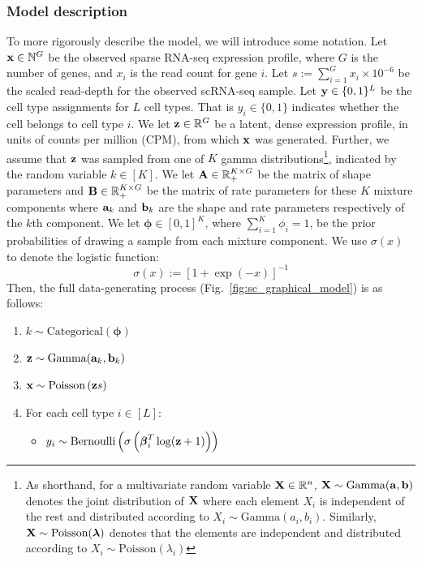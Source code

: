 \subsubsection{Model description}

To more rigorously describe the model, we will introduce some notation. Let $\bold{x} \in \mathbb{N}^G$ be the observed sparse RNA-seq expression profile, where $G$ is the number of genes, and $x_i$ is the read count for gene $i$.  Let $s := \sum_{i=1}^G x_i \times 10^{-6}$ be the scaled read-depth for the observed scRNA-seq sample. Let $\bold{y} \in \{0, 1\}^L$ be the cell type assignments for $L$ cell types. That is $y_i \in \{0, 1\}$ indicates whether the cell belongs to cell type $i$.  We let $\bold{z} \in \mathbb{R}^G$ be a latent, dense expression profile, in units of counts per million (CPM), from which $\bold{x}$ was generated.  Further, we assume that $\bold{z}$ was sampled from one of $K$ gamma distributions\footnote{As shorthand, for a multivariate random variable $\bold{X} \in \mathbb{R}^n$, $\bold{X} \sim \text{Gamma}(\bold{a}, \bold{b})$ denotes the joint distribution of $\bold{X}$ where each element $X_i$ is independent of the rest and distributed according to $X_i \sim \text{Gamma}(a_i, b_i)$. Similarly, $\bold{X} \sim \text{Poisson}(\boldsymbol{\lambda})$ denotes that the elements are independent and distributed according to $X_i \sim \text{Poisson}(\lambda_i)$}, indicated by the random variable $k \in [K]$. We let $\bold{A} \in \mathbb{R}_{+}^{K \times G}$ be the matrix of shape parameters and $\bold{B} \in \mathbb{R}_{+}^{K \times G}$  be the matrix of rate parameters for these $K$ mixture components where $\bold{a}_k$ and $\bold{b}_k$ are the shape and rate parameters respectively of the $k$th component. We let $\boldsymbol{\phi} \in [0,1]^K$, where $\sum_{i=1}^K \phi_i = 1$, be the prior probabilities of drawing a sample from each mixture component.  We use $\sigma(x)$ to denote the logistic function:
$$\sigma(x) := \left[1 + \exp(-x)\right]^{-1}$$
Then, the full data-generating process (Fig.~\ref{fig:sc_graphical_model}) is as follows:
\begin{enumerate}
\item $k \sim \text{Categorical}(\boldsymbol{\phi})$
\item $\bold{z} \sim \text{Gamma}(\bold{a}_k, \bold{b}_k)$
\item $\bold{x} \sim \text{Poisson}\left(\bold{z}s\right)$
\item For each cell type $i \in [L]$:
\begin{itemize}
\item $y_i \sim \text{Bernoulli}\left(\sigma\left(\boldsymbol{\beta}_i^T \log(\bold{z}+1)\right)\right)$
\end{itemize}
\end{enumerate}
